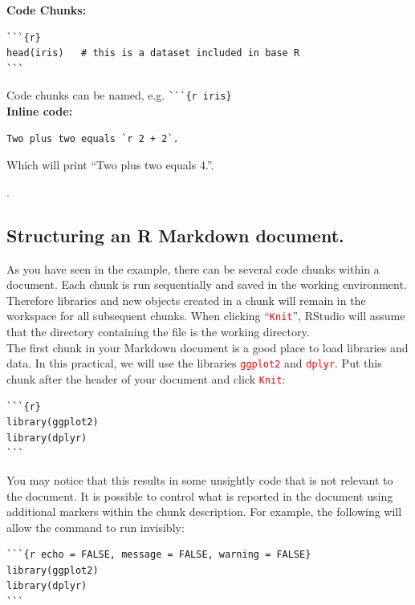 \documentclass[a4paper,12pt]{article}
\newcommand\code[1]{\textcolor{red}{\texttt{#1}}}
\begin{document}
\textbf{Code Chunks:}
\begin{shaded}
\begin{verbatim}
```{r}
head(iris)   # this is a dataset included in base R
```
\end{verbatim}
\end{shaded}

Code chunks can be named, e.g. \verb!```{r iris}! \\

\textbf{Inline code:}
\begin{shaded}
\begin{verbatim}
Two plus two equals `r 2 + 2`.
\end{verbatim}
\end{shaded}

Which will print ``Two plus two equals 4.''.

\vspace*{-1cm}.

\subsection{Structuring an R Markdown document.}

As you have seen in the example, there can be several code chunks within a document. Each chunk is run sequentially and saved in the working environment. Therefore libraries and new objects created in a chunk will remain in the workspace for all subsequent chunks. When clicking ``\code{Knit}'', RStudio will assume that the directory containing the file is the working directory. \\

The first chunk in your Markdown document is a good place to load libraries and data. In this practical, we will use the libraries \code{ggplot2} and \code{dplyr}. Put this chunk after the header of your document and click \code{Knit}:

\begin{shaded}
\begin{verbatim}
```{r}
library(ggplot2)
library(dplyr)
```
\end{verbatim}
\end{shaded}

You may notice that this results in some unsightly code that is not relevant to the document. It is possible to control what is reported in the document using additional markers within the chunk description. For example, the following will allow the command to run invisibly:

\begin{shaded}
\begin{verbatim}
```{r echo = FALSE, message = FALSE, warning = FALSE}
library(ggplot2)
library(dplyr)
```
\end{verbatim}
\end{shaded}
\end{document}
